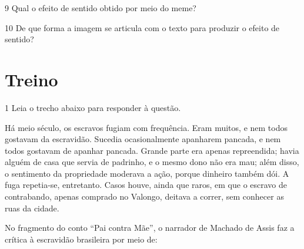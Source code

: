 {

\num{9} Qual o efeito de sentido obtido por meio do meme? 


\num{10} De que forma a imagem se articula com o texto para produzir
o efeito de sentido?


\section{Treino}

\num{1} Leia o trecho abaixo para responder à questão. 

\begin{myquote}

Há meio século, os escravos fugiam com frequência. Eram muitos, e nem todos
gostavam da escravidão. Sucedia ocasionalmente apanharem pancada, e nem todos
gostavam de apanhar pancada. Grande parte era apenas repreendida; havia alguém de
casa que servia de padrinho, e o mesmo dono não era mau; além disso, o sentimento da
propriedade moderava a ação, porque dinheiro também dói. A fuga repetia-se,
entretanto. Casos houve, ainda que raros, em que o escravo de contrabando, apenas
comprado no Valongo, deitava a correr, sem conhecer as ruas da cidade.

\end{myquote}


No fragmento do conto ``Pai contra Mãe'', o narrador de Machado de Assis faz a crítica
à escravidão brasileira por meio de:

}
